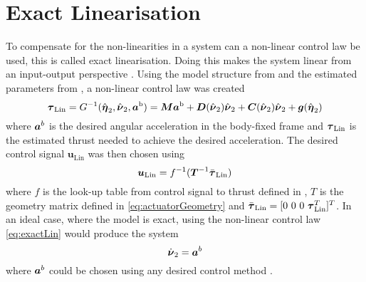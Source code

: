 \section{Exact Linearisation}
To compensate for the non-linearities in a system can a non-linear control law be used, this is called exact linearisation. Doing this makes the system linear from an input-output perspective \citep{reglerteori}. Using the model structure from  and the estimated parameters from , a non-linear control law was created 
\begin{equation}\label{eq:exactLin}
\boldsymbol{\tau}_{\text{Lin}} = G^{-1}(\hat{\boldsymbol{\eta}}_{2},\hat{\boldsymbol{\nu}}_{2},\boldsymbol{a}^{\text{b}}) = \boldsymbol{M} \boldsymbol{a}^{\text{b}} + \boldsymbol{D}(\hat{\boldsymbol{\nu}}_{2})\hat{\boldsymbol{\nu}}_{2} + \boldsymbol{C}(\hat{\boldsymbol{\nu}}_{2})\hat{\boldsymbol{\nu}}_{2} + \boldsymbol{g}(\hat{\boldsymbol{\eta}}_{2})
\end{equation}
where $\boldsymbol{a}^b$ is the desired angular acceleration in the body-fixed frame and $\boldsymbol{\tau}_{\text{Lin}}$ is the estimated thrust needed to achieve the desired acceleration.
The desired control signal $\boldsymbol{u}_{\text{Lin}}$ was then chosen using 
\begin{equation}\label{eq:linControlSignal}
\boldsymbol{u}_{\text{Lin}} = f^{-1}(\boldsymbol{T}^{-1} \bar{\boldsymbol{\tau}}_{\text{Lin}})
\end{equation} where $f$ is the look-up table from control signal to thrust defined in , $T$ is the geometry matrix defined in \eqref{eq:actuatorGeometry} and $\bar{\boldsymbol{\tau}}_{\text{Lin}}=[0~0~0~\boldsymbol{\tau}_{\text{Lin}}^T]^T$.
In an ideal case, where the model is exact, using the non-linear control law \eqref{eq:exactLin} would produce the system
\begin{equation}\label{eq:exactLinSys}
\dot{\boldsymbol{\nu}}_{2} = \boldsymbol{a}^b
\end{equation} 
where $\boldsymbol{a}^b$ could be chosen using any desired control method \citep[p.451]{fossen2011}.

